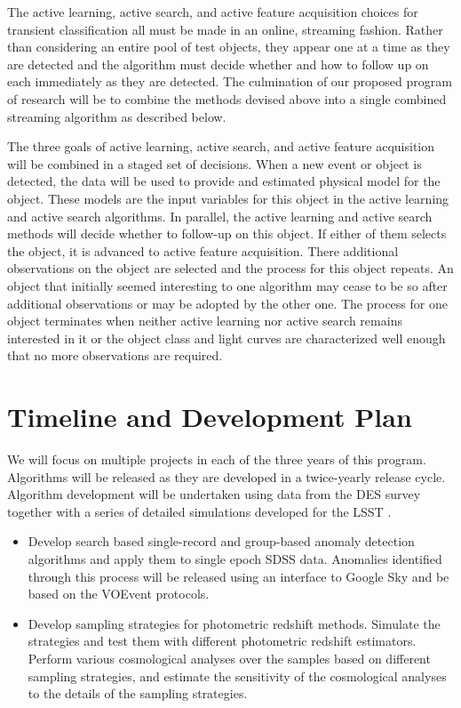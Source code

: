 \documentclass[useAMS,usenatbib,tightenlines,11pt,preprint]{aastex}
\begin{document}
The active learning, active search, and active feature
acquisition choices for transient classification
all must be made in an online, streaming fashion.  
Rather than
considering an entire pool of test objects, they appear one at a time as
they are detected and the algorithm must decide whether and how to follow
up on each immediately as they are detected.  The culmination of our proposed
program of research will be to combine the methods devised above into a single
combined streaming algorithm as described below.

The three goals of active learning, active search, and active feature
acquisition will be combined
in a staged set of decisions.  When a new event or object is detected, the data
will be used to provide and estimated physical model for the object.
These models are the input variables for this object in the active
learning and active search algorithms.  In parallel, the active learning
and active search methods will decide whether to follow-up on this object.
If either of them selects the object, it is advanced to active feature
acquisition.  There additional observations on the object are selected and
the process for this object repeats.  An object that initially seemed
interesting to one algorithm may cease to be so after additional
observations or may be adopted by the other one.  The process for one
object terminates when neither active learning nor active search remains
interested in it or the object class and light curves are characterized
well enough that no more observations are required.

\section{Timeline and Development Plan}

We will focus on multiple projects in each of the three years of this
program.  Algorithms will be released as they are developed in a
twice-yearly release cycle.  Algorithm development will be undertaken
using data from the DES survey together with a series of detailed
simulations developed for the LSST \cite{connolly10}.


\begin{itemize}

\item Develop search based single-record and group-based anomaly detection
algorithms and apply them to single epoch SDSS data.  Anomalies identified
through this process will be released using an interface to Google Sky and
be based on the VOEvent protocols.

\item Develop sampling strategies for photometric redshift
 methods. Simulate the strategies and test them with different photometric
 redshift estimators.  Perform various cosmological analyses over the
 samples based on different sampling strategies, and estimate the
 sensitivity of the cosmological analyses to the details of the sampling
 strategies.

\end{itemize}
\end{document}
